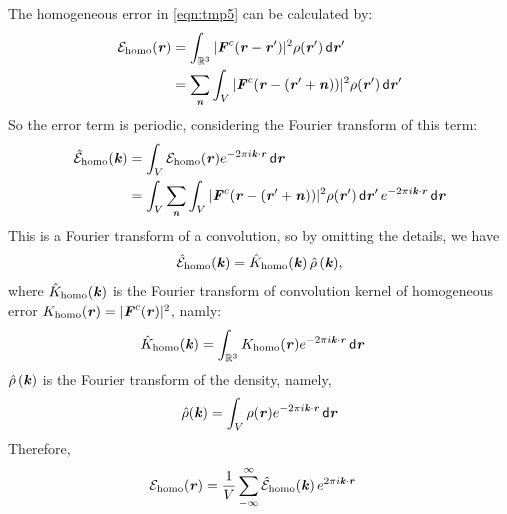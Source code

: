 \documentclass[aps,pre,preprint]{revtex4}
\renewcommand{\v}[1]{\textbf{\textit{#1}}}
\renewcommand{\d}[1]{\textsf{#1}}
\begin{document}
The homogeneous error in \eqref{eqn:tmp5} can be calculated by:
\begin{align}\nonumber
  \mathcal E_{\textrm{homo}}(\v r)
  & = \int_{\mathbb R^3}\vert\v F^c(\v r - \v r')\vert^2\rho(\v r')\,\d d\v r' \\ \nonumber
  & = \sum_{\v n} \int_V \vert\v F^c(\v r - (\v r'+\v n))\vert^2\rho(\v r')\,\d d\v r'
\end{align}
So the error term is periodic, considering the Fourier transform of
this term:
\begin{align}\nonumber
  \hat{\mathcal E}_{\textrm{homo}}(\v k)
  & =
  \int_V\mathcal E_{\textrm{homo}}(\v r)e^{-2\pi i\v k\cdot\v r}\,\d d\v r \\ \nonumber
  & =
  \int_V
  \sum_{\v n} \int_V \vert\v F^c(\v r - (\v r'+\v n))\vert^2\rho(\v r')\,\d d\v r'\,
  e^{-2\pi i\v k\cdot\v r}\,\d d\v r
\end{align}
This is a Fourier transform of a convolution, so by omitting the details, we have
\begin{align}
  \hat{\mathcal E}_{\textrm{homo}}(\v k) = \hat K_{\textrm{homo}}(\v k)\,\hat\rho\,(\v k),
\end{align}
where $\hat K_{\textrm{homo}}(\v k)$ is the Fourier transform of
convolution kernel of homogeneous error $K_{\textrm{homo}}(\v r) = \vert\v F^c(\v
r)\vert^2$, namly:
\begin{align}
  \hat K_{\textrm{homo}}(\v k)
  &=
  \int_{\mathbb R^3}K_{\textrm{homo}}(\v r)e^{-2\pi i\v k\cdot\v r}\,\d d\v r
\end{align}
$\hat\rho\,(\v k)$ is the Fourier transform of the density, namely,
\begin{align}
  \hat\rho(\v k) = \int_V\rho(\v r)e^{-2\pi i\v k\cdot\v r}\,\d d\v r
\end{align}
Therefore,
\begin{align}\label{eqn:tmp11}
  \mathcal E_{\textrm{homo}}(\v r)
  &=
  \frac1V\sum_{-\infty}^\infty \hat{\mathcal E}_{\textrm{homo}}(\v k)\,e^{2\pi i\v k\cdot\v r}
\end{align}
\end{document}
